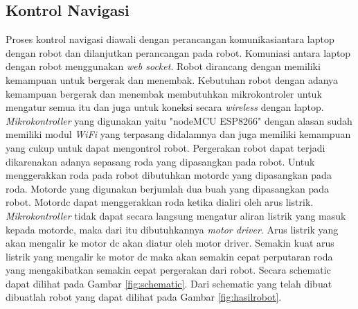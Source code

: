 \subsection{Kontrol Navigasi}
Proses kontrol navigasi diawali dengan perancangan komunikasiantara laptop dengan robot dan dilanjutkan perancangan pada robot. Komuniasi antara laptop dengan robot menggunakan \emph{web socket}. Robot dirancang dengan memiliki kemampuan untuk bergerak dan menembak.  Kebutuhan robot dengan adanya kemampuan bergerak dan menembak membutuhkan mikrokontroler untuk mengatur semua itu dan juga untuk koneksi secara \emph{wireless} dengan laptop. \emph{Mikrokontroller} yang digunakan yaitu "nodeMCU ESP8266" dengan alasan sudah memiliki modul \emph{WiFi} yang terpasang didalamnya dan juga memiliki kemampuan yang cukup untuk dapat mengontrol robot. Pergerakan robot dapat terjadi dikarenakan adanya sepasang roda yang dipasangkan pada robot. Untuk menggerakkan roda pada robot dibutuhkan motordc yang dipasangkan pada roda. Motordc yang digunakan berjumlah dua buah yang dipasangkan pada robot. Motordc dapat menggerakkan roda ketika dialiri oleh arus listrik. \emph{Mikrokontroller} tidak dapat secara langsung mengatur aliran listrik yang masuk kepada motordc, maka dari itu dibutuhkannya \emph{motor driver}. Arus listrik yang akan mengalir ke motor dc akan diatur oleh motor driver. Semakin kuat arus listrik yang mengalir ke motor dc maka akan semakin cepat perputaran roda yang mengakibatkan semakin cepat pergerakan dari robot. Secara schematic dapat dilihat pada Gambar \ref{fig:schematic}. Dari schematic yang telah dibuat dibuatlah robot yang dapat dilihat pada Gambar \ref{fig:hasilrobot}.

